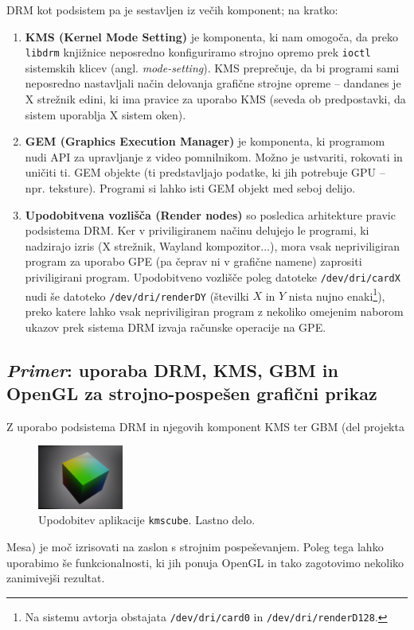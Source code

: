 \documentclass{article}
\begin{document}
DRM kot podsistem pa je sestavljen iz večih komponent; na kratko: \autocite{drm}

\begin{enumerate}
    \item \textbf{KMS (Kernel Mode Setting)} je komponenta, ki nam omogoča, da preko \texttt{libdrm} knjižnice neposredno konfiguriramo strojno opremo prek \texttt{ioctl} sistemskih klicev (angl. \textit{mode-setting}). KMS preprečuje, da bi programi sami neposredno nastavljali način delovanja grafične strojne opreme -- dandanes je X strežnik edini, ki ima pravice za uporabo KMS (seveda ob predpostavki, da sistem uporablja X sistem oken).
    \item \textbf{GEM (Graphics Execution Manager)} je komponenta, ki programom nudi API za upravljanje z video pomnilnikom. Možno je ustvariti, rokovati in uničiti ti. GEM objekte (ti predstavljajo podatke, ki jih potrebuje GPU -- npr. teksture). Programi si lahko isti GEM objekt med seboj delijo.
    \item \textbf{Upodobitvena vozlišča (Render nodes)} so posledica arhitekture pravic podsistema DRM. Ker v priviligiranem načinu delujejo le programi, ki nadzirajo izris (X strežnik, Wayland kompozitor...), mora vsak nepriviligiran program za uporabo GPE (pa čeprav ni v grafične namene) zaprositi priviligirani program. Upodobitveno vozlišče poleg datoteke \texttt{/dev/dri/cardX} nudi še datoteko \texttt{/dev/dri/renderDY} (številki $X$ in $Y$ nista nujno enaki\footnote{Na sistemu avtorja obstajata \texttt{/dev/dri/card0} in \texttt{/dev/dri/renderD128}.}), preko katere lahko vsak nepriviligiran program z nekoliko omejenim naborom ukazov prek sistema DRM izvaja računske operacije na GPE.
\end{enumerate}

\subsection{\textit{Primer}: uporaba DRM, KMS, GBM in OpenGL za strojno-pospešen grafični prikaz}
Z uporabo podsistema DRM in njegovih komponent KMS ter GBM (del projekta 
\begin{figure}
    \centering
    \includegraphics[width=0.25\textwidth]{kmscube-image}
    \caption{Upodobitev aplikacije \texttt{kmscube}. Lastno delo.}
\end{figure}
Mesa) je moč izrisovati na zaslon s strojnim pospeševanjem. Poleg tega lahko uporabimo še funkcionalnosti, ki jih ponuja OpenGL in tako zagotovimo nekoliko zanimivejši rezultat.
\end{document}
